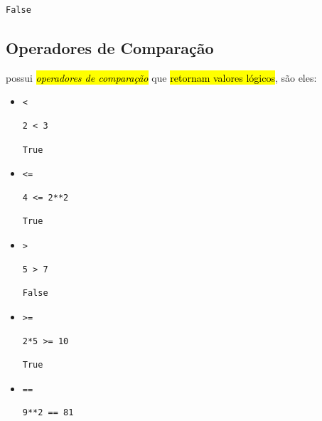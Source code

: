 \begin{verbatim}
False
\end{verbatim}

\subsection{Operadores de Comparação}

{\python} possui \hl{\emph{operadores de comparação}} que \hl{retornam valores lógicos}, são eles:
\begin{itemize}
\item \lstinline+<+ 

\begin{lstlisting}[xrightmargin=2.5em]
2 < 3
\end{lstlisting}

\begin{verbatim}
True
\end{verbatim}

\item \lstinline+<=+ 

\begin{lstlisting}[xrightmargin=2.5em]
4 <= 2**2
\end{lstlisting}

\begin{verbatim}
True
\end{verbatim}

\item \lstinline+>+ 

\begin{lstlisting}[xrightmargin=2.5em]
5 > 7
\end{lstlisting}

\begin{verbatim}
False
\end{verbatim}

\item \lstinline+>=+ 

\begin{lstlisting}[xrightmargin=2.5em]
2*5 >= 10
\end{lstlisting}

\begin{verbatim}
True
\end{verbatim}

\item \lstinline+==+ 

\begin{lstlisting}[xrightmargin=2.5em]
9**2 == 81
\end{lstlisting}


\end{itemize}
